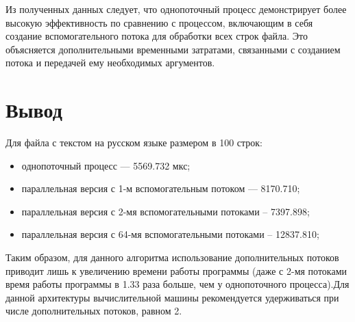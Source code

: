 \clearpage


Из полученных данных следует, что однопоточный процесс демонстрирует более высокую эффективность по сравнению с процессом, включающим в себя создание вспомогательного потока для обработки всех строк файла. Это объясняется дополнительными временными затратами, связанными с созданием потока и передачей ему необходимых аргументов.



\section*{Вывод}

Для файла с текстом на русском языке размером в 100 строк:

\begin{itemize}[label*=--]
	\item однопоточный процесс --- 5569.732 мкс;
	\item параллельная версия с 1-м вспомогательным потоком --- 8170.710;
	\item параллельная версия с 2-мя вспомогательными потоками -- 7397.898;
	\item параллельная версия с 64-мя вспомогательными потоками -- 12837.810;
\end{itemize}

Таким образом, для данного алгоритма использование дополнительных потоков приводит лишь к увеличению времени работы программы (даже с 2-мя потоками время работы программы в 1.33 раза больше, чем у однопоточного процесса).Для данной архитектуры вычислительной машины рекомендуется удерживаться при числе дополнительных потоков, равном 2.

